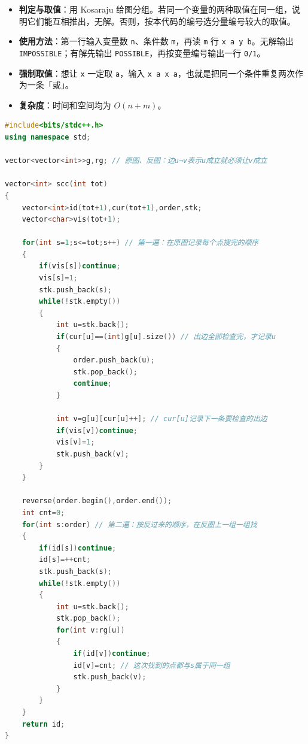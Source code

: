 \documentclass[10pt,landscape,a4paper]{article}
\begin{document}
\begin{multicols*}{3}
\begin{itemize}
\item \textbf{判定与取值}：用 Kosaraju 给图分组。若同一个变量的两种取值在同一组，说明它们能互相推出，无解。否则，按本代码的编号选分量编号较大的取值。
\item \textbf{使用方法}：第一行输入变量数 \texttt{n}、条件数 \texttt{m}，再读 \texttt{m} 行 \texttt{x\allowbreak{} \allowbreak{}a\allowbreak{} \allowbreak{}y\allowbreak{} \allowbreak{}b}。无解输出 \texttt{I\allowbreak{}M\allowbreak{}P\allowbreak{}O\allowbreak{}S\allowbreak{}S\allowbreak{}I\allowbreak{}B\allowbreak{}L\allowbreak{}E}；有解先输出 \texttt{P\allowbreak{}O\allowbreak{}S\allowbreak{}S\allowbreak{}I\allowbreak{}B\allowbreak{}L\allowbreak{}E}，再按变量编号输出一行 \texttt{0\allowbreak{}/\allowbreak{}1}。
\item \textbf{强制取值}：想让 \texttt{x} 一定取 \texttt{a}，输入 \texttt{x\allowbreak{} \allowbreak{}a\allowbreak{} \allowbreak{}x\allowbreak{} \allowbreak{}a}，也就是把同一个条件重复两次作为一条「或」。
\item \textbf{复杂度}：时间和空间均为 $O(n+m)$。
\end{itemize}
\par{}\par
\begin{lstlisting}[language=C++]
#include<bits/stdc++.h>
using namespace std;

vector<vector<int>>g,rg; // 原图、反图：边u→v表示u成立就必须让v成立

vector<int> scc(int tot)
{
    vector<int>id(tot+1),cur(tot+1),order,stk;
    vector<char>vis(tot+1);

    for(int s=1;s<=tot;s++) // 第一遍：在原图记录每个点搜完的顺序
    {
        if(vis[s])continue;
        vis[s]=1;
        stk.push_back(s);
        while(!stk.empty())
        {
            int u=stk.back();
            if(cur[u]==(int)g[u].size()) // 出边全部检查完，才记录u
            {
                order.push_back(u);
                stk.pop_back();
                continue;
            }

            int v=g[u][cur[u]++]; // cur[u]记录下一条要检查的出边
            if(vis[v])continue;
            vis[v]=1;
            stk.push_back(v);
        }
    }

    reverse(order.begin(),order.end());
    int cnt=0;
    for(int s:order) // 第二遍：按反过来的顺序，在反图上一组一组找
    {
        if(id[s])continue;
        id[s]=++cnt;
        stk.push_back(s);
        while(!stk.empty())
        {
            int u=stk.back();
            stk.pop_back();
            for(int v:rg[u])
            {
                if(id[v])continue;
                id[v]=cnt; // 这次找到的点都与s属于同一组
                stk.push_back(v);
            }
        }
    }
    return id;
}


\end{lstlisting}
\end{multicols*}
\end{document}
